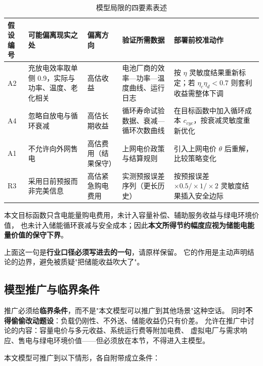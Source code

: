 \begin{table}[htbp]
  \centering
  \caption{模型局限的四要素表述}
  \label{tab:limitation}
  \footnotesize
  \begin{tabularx}{\linewidth}{C{1.6cm} L{3.6cm} C{1.8cm} L{3.2cm} Y}
    \toprule
    假设编号 & 可能偏离现实之处 & 偏离方向 & 验证所需数据 & 部署前校准动作 \\
    \midrule
    A2 & 充放电效率取单侧 0.9，实际与功率、温度、老化相关
       & 高估收益 & 电池厂商的效率—功率—温度曲线、运行日志
       & 按 \(\eta\) 灵敏度结果重新标定；若 \(\eta_c\eta_d<0.7\) 则套利收益需整体下调 \\
    A4 & 忽略自放电与循环衰减
       & 高估长期收益 & 循环寿命试验数据、衰减—循环次数曲线
       & 在目标函数中加入循环成本 \(c_{cyc}\)，按衰减灵敏度重新优化 \\
    A1 & 不允许向外网售电
       & 高估费用（结果保守） & 上网电价政策与结算规则
       & 引入上网电价 \(\theta\) 后重解，比较策略变化 \\
    R3 & 采用日前预报而非完美信息
       & 高估紧急购电费用 & 实测预报误差序列（更长历史）
       & 按预报误差 \(\times0.5/\times1/\times2\) 灵敏度结果插入安全边际 \\
    \bottomrule
  \end{tabularx}
\end{table}

本文目标函数只含电能量购电费用，未计入容量补偿、辅助服务收益与绿电环境价值，
也未计入储能循环衰减与安全成本；因此\textbf{本文所得节约幅度应视为储能电能量价值的保守下界}。

\begin{guideblock}
上面这一句是\textbf{行业口径必须写进去的一句}，请原样保留。
它的作用是主动声明结论的边界，避免被质疑"把储能收益吹大了"。
\end{guideblock}

\subsection{模型推广与临界条件}

\begin{guideblock}
推广必须给\textbf{临界条件}，而不是"本文模型可以推广到其他场景"这种空话。
同时\textbf{不得偷偷改动题设}：负载仍刚性、不外送、储能收益仍只有价差。
允许在推广中讨论的内容：容量电价与多元收益、系统运行费等附加电费、
虚拟电厂与需求响应、售电与绿电环境价值——但必须放在本节，不得进入主模型。
\end{guideblock}

本文模型可推广到以下情形，各自附带成立条件：

